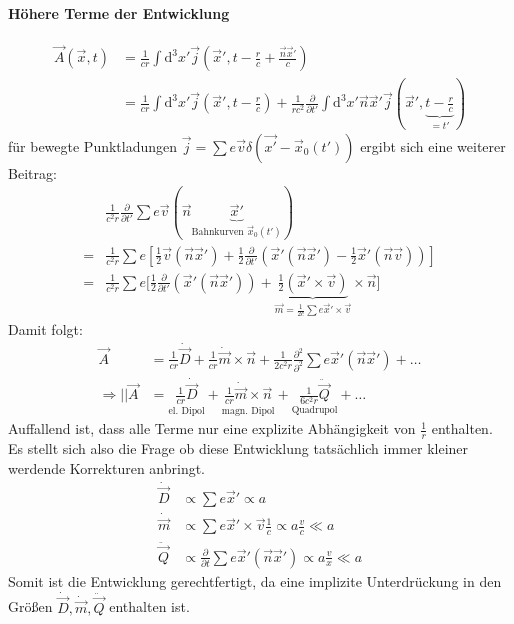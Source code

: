 \documentclass[a4paper]{article}
\newcommand{\intd}{\int\!\mathrm{d}}
\begin{document}
\paragraph{Höhere Terme der Entwicklung}
\begin{align}
\vec{A}(\vec{x},t)&=\frac{1}{cr}\intd^3x'
\vec{j}(\vec{x}',t-\frac{r}{c}+\frac{\vec{n}\vec{x}'}{c})\\
&= \frac{1}{cr}\intd^3x'
\vec{j}(\vec{x}',t-\frac{r}{c})+\frac{1}{rc^2}\frac{\partial}{\partial
t'}\intd^3x' \vec{n}\vec{x}'\vec{j}(\vec{x}',\underbrace{t-\frac{r}{c}}_{=t'})
\end{align}
für bewegte Punktladungen $\vec{j}=\sum e\vec{v} \delta(\vec{x'}-\vec{x}_0(t'))$
ergibt sich eine weiterer Beitrag:
\begin{align}
&\frac{1}{c^2r}\frac{\partial}{\partial t'}\sum
e\vec{v}(\vec{n}\underbrace{\vec{x}'}_{\text{Bahnkurven }\vec{x}_0(t')})\\
=&\frac{1}{c^2r}\sum e \left[\frac{1}{2}\vec{v}(\vec{n}\vec{x}')+
\frac{1}{2}\frac{\partial}{\partial t'} \left( \vec{x}' (\vec{n}\vec{x}') -
\frac{1}{2}\vec{x}'(\vec{n}\vec{v})\right)\right]\\
=&\frac{1}{c^2r}\sum e \Big[\frac{1}{2} \frac{\partial}{\partial t'} \left(
\vec{x}' (\vec{n}\vec{x}') \right)
+\underbrace{\frac{1}{2}(\vec{x}'\times\vec{v})}_{\vec{m}=\frac{1}{2c}\sum
e\vec{x}'\times\vec{v}}\times\vec{n}\Big]
\end{align}
Damit folgt:
\begin{align}
\vec{A}&=\frac{1}{cr}\dot{\vec{D}}+\frac{1}{cr}\dot{\vec{m}}\times\vec{n}+\frac{1}{2c^2r}\frac{\partial^2}{\partial^2}
\sum e\vec{x}'(\vec{n}\vec{x}')+\ldots\\
\Rightarrow
||\vec{A}&=\underset{\text{el. Dipol}}{\frac{1}{cr}\dot{\vec{D}}}+
\underset{\text{magn. Dipol}}{\frac{1}{cr}\dot{\vec{m}}\times\vec{n}}+
\underset{\text{Quadrupol}}{\frac{1}{6c^2r}\ddot{\vec{Q}}}+\ldots
\end{align}
Auffallend ist, dass alle Terme nur eine explizite Abhängigkeit von
$\frac{1}{r}$ enthalten. Es stellt sich also die Frage ob diese Entwicklung
tatsächlich immer kleiner werdende Korrekturen anbringt. 
\begin{align}
\dot{\vec{D}}&\propto \sum e\vec{x}'\propto a\\
\dot{\vec{m}}&\propto \sum e\vec{x}'\times\vec{v}\frac{1}{c} \propto
a\frac{v}{c} \ll a\\
\ddot{\vec{Q}}&\propto \frac{\partial}{\partial t}\sum
e\vec{x}'(\vec{n}\vec{x}')\propto a\frac{v}{x} \ll a
\end{align}
Somit ist die Entwicklung gerechtfertigt, da eine implizite Unterdrückung in den
Größen $\dot{\vec{D}},\dot{\vec{m}},\ddot{\vec{Q}}$ enthalten ist.
\end{document}
